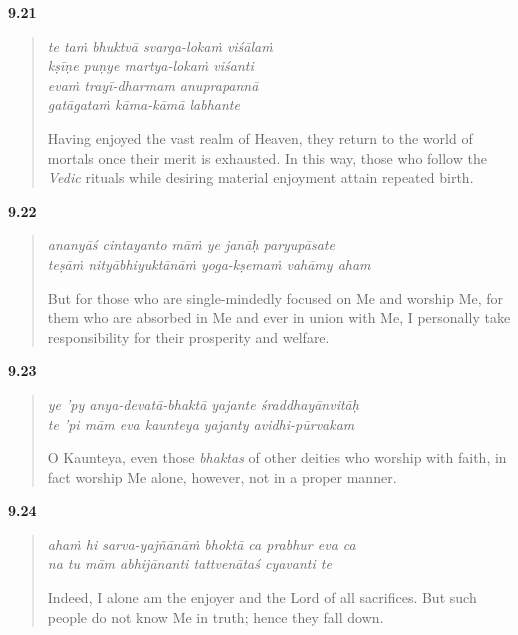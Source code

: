 \par\noindent\textbf{9.21}\par
\begin{verse}
\textit{te taṁ bhuktvā svarga-lokaṁ viśālaṁ} \\
\textit{kṣīṇe puṇye martya-lokaṁ viśanti} \\
\textit{evaṁ trayī-dharmam anuprapannā} \\
\textit{gatāgataṁ kāma-kāmā labhante}

\noindent Having enjoyed the vast realm of Heaven, they return to the world of mortals once their merit is exhausted. In this way, those who follow the \textit{Vedic} rituals while desiring material enjoyment attain repeated birth.
\end{verse}
\par



\par\noindent\textbf{9.22}\par
\begin{verse}
\textit{ananyāś cintayanto māṁ ye janāḥ paryupāsate} \\
\textit{teṣāṁ nityābhiyuktānāṁ yoga-kṣemaṁ vahāmy aham}

\noindent But for those who are single-mindedly focused on Me and worship Me, for them who are absorbed in Me and ever in union with Me, I personally take responsibility for their prosperity and welfare.
\end{verse}
\par



\par\noindent\textbf{9.23}\par
\begin{verse}
\textit{ye ’py anya-devatā-bhaktā yajante śraddhayānvitāḥ} \\
\textit{te ’pi mām eva kaunteya yajanty avidhi-pūrvakam}

\noindent O Kaunteya, even those \textit{bhaktas} of other deities who worship with faith, in fact worship Me alone, however, not in a proper manner.
\end{verse}
\par



\par\noindent\textbf{9.24}\par
\begin{verse}
\textit{ahaṁ hi sarva-yajñānāṁ bhoktā ca prabhur eva ca} \\
\textit{na tu mām abhijānanti tattvenātaś cyavanti te}

\noindent Indeed, I alone am the enjoyer and the Lord of all sacrifices. But such people do not know Me in truth; hence they fall down.
\end{verse}
\par



